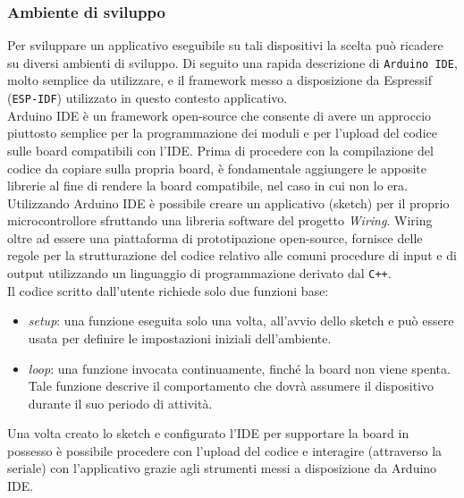 \subsubsection{Ambiente di sviluppo}
Per sviluppare un applicativo eseguibile su tali dispositivi la scelta può ricadere su diversi ambienti di sviluppo. Di seguito una rapida descrizione di \texttt{Arduino IDE}, molto semplice da utilizzare, e il framework messo a disposizione da Espressif (\texttt{ESP-IDF}) utilizzato in questo contesto applicativo.\\
Arduino IDE \cite{arduino18} è un framework open-source che consente di avere un approccio piuttosto semplice per la programmazione dei moduli e per l'upload del codice sulle board compatibili con l'IDE. Prima di procedere con la compilazione del codice da copiare sulla propria board, è fondamentale aggiungere le apposite librerie al fine di rendere la board compatibile, nel caso in cui non lo era.\\
Utilizzando Arduino IDE è possibile creare un applicativo (sketch) per il proprio microcontrollore sfruttando una libreria software del progetto \textit{Wiring}. Wiring oltre ad essere una piattaforma di prototipazione open-source, fornisce delle regole per la strutturazione del codice relativo alle comuni procedure di input e di output utilizzando un linguaggio di programmazione derivato dal \texttt{C++}.\\
Il codice scritto dall'utente richiede solo due funzioni base: 
\begin{itemize}
    \item \textit{setup}: una funzione eseguita solo una volta, all'avvio dello sketch e può essere usata per definire le impostazioni iniziali dell'ambiente.
    \item \textit{loop}: una funzione invocata continuamente, finché la board non viene spenta. Tale funzione descrive il comportamento che dovrà assumere il dispositivo durante il suo periodo di attività.
\end{itemize}
Una volta creato lo sketch e configurato l'IDE per supportare la board in possesso è possibile procedere con l'upload del codice e interagire (attraverso la seriale) con l'applicativo grazie agli strumenti messi a disposizione da Arduino IDE.\\

